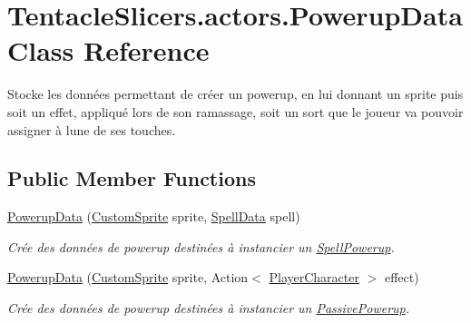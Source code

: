 \hypertarget{class_tentacle_slicers_1_1actors_1_1_powerup_data}{}\section{Tentacle\+Slicers.\+actors.\+Powerup\+Data Class Reference}
\label{class_tentacle_slicers_1_1actors_1_1_powerup_data}


Stocke les données permettant de créer un powerup, en lui donnant un sprite puis soit un effet, appliqué lors de son ramassage, soit un sort que le joueur va pouvoir assigner à l\textquotesingle{}une de ses touches.  


\subsection*{Public Member Functions}
\begin{DoxyCompactItemize}
\item 
\hyperlink{class_tentacle_slicers_1_1actors_1_1_powerup_data_a9a5c4ceb7a6fc39f8de165d397c63d81}{Powerup\+Data} (\hyperlink{class_tentacle_slicers_1_1graphics_1_1_custom_sprite}{Custom\+Sprite} sprite, \hyperlink{class_tentacle_slicers_1_1spells_1_1_spell_data}{Spell\+Data} spell)
\begin{DoxyCompactList}\small\item\em Crée des données de powerup destinées à instancier un \hyperlink{class_tentacle_slicers_1_1actors_1_1_spell_powerup}{Spell\+Powerup}. \end{DoxyCompactList}\item 
\hyperlink{class_tentacle_slicers_1_1actors_1_1_powerup_data_ad2e38db9e1280b5cc7730111be944e5e}{Powerup\+Data} (\hyperlink{class_tentacle_slicers_1_1graphics_1_1_custom_sprite}{Custom\+Sprite} sprite, Action$<$ \hyperlink{class_tentacle_slicers_1_1actors_1_1_player_character}{Player\+Character} $>$ effect)
\begin{DoxyCompactList}\small\item\em Crée des données de powerup destinées à instancier un \hyperlink{class_tentacle_slicers_1_1actors_1_1_passive_powerup}{Passive\+Powerup}. \end{DoxyCompactList}\end{DoxyCompactItemize}
